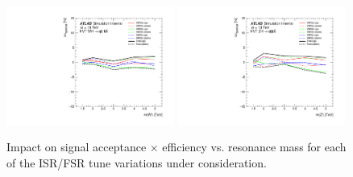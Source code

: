 \begin{figure}[htbp!]
\begin{center}
\includegraphics[width=0.49\textwidth]{VHqqbb_ISR_FSR_Eff_Variation_WH.pdf}
\includegraphics[width=0.49\textwidth]{VHqqbb_ISR_FSR_Eff_Variation_ZH.pdf}
\end{center}
\caption{
    Impact on signal acceptance $\times$ efficiency vs. resonance mass for each of the ISR/FSR tune variations under consideration.
}
\label{fig:isr_fsr_impact}
\end{figure}
